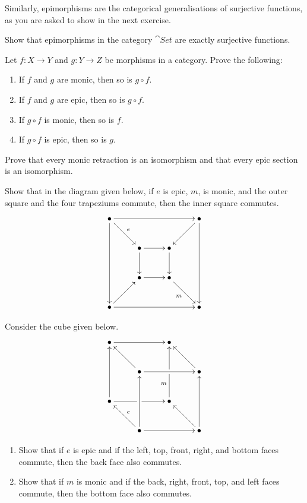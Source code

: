 Similarly, epimorphisms are the categorical generalisations of surjective functions, as you are asked to show in the next exercise.

\begin{Exercise}
Show that epimorphisms in the category $\cat{Set}$ are exactly surjective functions.
\end{Exercise}

\begin{Exercise}
Let $f \colon X \to Y$ and $g \colon Y \to Z$ be morphisms in a category. Prove the following:
\begin{enumerate}
\item If $f$ and $g$ are monic, then so is $g \circ f$.
\item If $f$ and $g$ are epic, then so is $g \circ f$.
\item If $g \circ f$ is monic, then so is $f$.
\item If $g \circ f$ is epic, then so is $g$.
\end{enumerate}
\end{Exercise}

\begin{Exercise}
Prove that every monic retraction is an isomorphism and that every epic section is an isomorphism.
\end{Exercise}

\begin{Exercise}
Show that in the diagram given below, if $e$ is epic, $m$, is monic, and the outer square and the four trapeziums commute, then the inner square commutes.
\begin{equation*}
\xymatrix@=2.5em{
\bullet \ar[ddd] \ar[rd]^e \ar[rrr] &&& \bullet \ar[ld] \ar[ddd] \\
& \bullet \ar[d] \ar[r] & \bullet \ar[d] & \\
& \bullet \ar[r] & \bullet \ar[rd]_m & \\
\bullet \ar[ru] \ar[rrr] &&& \bullet
}
\end{equation*}
\end{Exercise}

\begin{Exercise}
Consider the cube given below.
\begin{equation*}
\xymatrix@=2.5em{
\bullet \ar[rr] && \bullet & \\
& \bullet \ar[lu] \ar[rr] && \bullet \ar[lu] \\
\bullet \ar[uu] \ar[rr]|\hole && \bullet \ar[uu]|\hole^(0.3)m & \\
& \bullet \ar[lu]_e \ar[uu] \ar[rr] && \bullet \ar[lu] \ar[uu]
}
\end{equation*}
\begin{enumerate}
\item Show that if $e$ is epic and if the left, top, front, right, and bottom faces commute, then the back face also commutes.
\item Show that if $m$ is monic and if the back, right, front, top, and left faces commute, then the bottom face also commutes.
\end{enumerate}
\end{Exercise}


